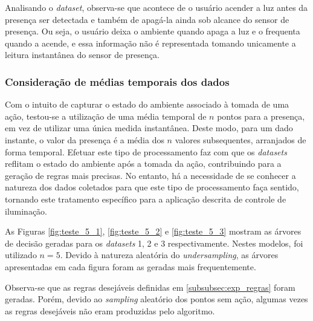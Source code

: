 Analisando o \textit{dataset}, observa-se que acontece de o usuário acender a luz antes da presença ser detectada e também de apagá-la ainda sob alcance do sensor de presença. Ou seja, o usuário deixa o ambiente quando apaga a luz e o frequenta quando a acende, e essa informação não é representada tomando unicamente a leitura instantânea do sensor de presença.

\clearpage

\subsubsection{Consideração de médias temporais dos dados}
Com o intuito de capturar o estado do ambiente associado à tomada de uma ação, testou-se a utilização de uma média temporal de $n$ pontos para a presença, em vez de utilizar uma única medida instantânea. Deste modo, para um dado instante, o valor da presença é a média dos $n$ valores subsequentes, arranjados de forma temporal. Efetuar este tipo de processamento faz com que os \textit{datasets} reflitam o estado do ambiente após a tomada da ação, contribuindo para a geração de regras mais precisas. No entanto, há a necessidade de se conhecer a natureza dos dados coletados para que este tipo de processamento faça sentido, tornando este tratamento específico para a aplicação descrita de controle de iluminação.

As Figuras \ref{fig:teste_5_1}, \ref{fig:teste_5_2} e \ref{fig:teste_5_3} mostram as árvores de decisão geradas para os \textit{datasets} 1, 2 e 3 respectivamente. Nestes modelos, foi utilizado $n=5$. Devido à natureza aleatória do \textit{undersampling}, as árvores apresentadas em cada figura foram as geradas mais frequentemente.

Observa-se que as regras desejáveis definidas em \ref{subsubsec:exp_regras} foram geradas. Porém, devido ao \textit{sampling} aleatório dos pontos sem ação, algumas vezes as regras desejáveis não eram produzidas pelo algoritmo.


